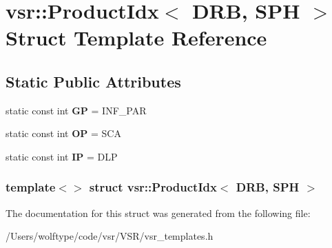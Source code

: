 \hypertarget{structvsr_1_1_product_idx_3_01_d_r_b_00_01_s_p_h_01_4}{\section{vsr\-:\-:Product\-Idx$<$ D\-R\-B, S\-P\-H $>$ Struct Template Reference}
\label{structvsr_1_1_product_idx_3_01_d_r_b_00_01_s_p_h_01_4}
}
\subsection*{Static Public Attributes}
\begin{DoxyCompactItemize}
\item 
\hypertarget{structvsr_1_1_product_idx_3_01_d_r_b_00_01_s_p_h_01_4_a41644a48ad4ee1b5ca718ecca1236690}{static const int {\bfseries G\-P} = I\-N\-F\-\_\-\-P\-A\-R}\label{structvsr_1_1_product_idx_3_01_d_r_b_00_01_s_p_h_01_4_a41644a48ad4ee1b5ca718ecca1236690}

\item 
\hypertarget{structvsr_1_1_product_idx_3_01_d_r_b_00_01_s_p_h_01_4_af702aeadbdce15f7fdeeaac12762a60e}{static const int {\bfseries O\-P} = S\-C\-A}\label{structvsr_1_1_product_idx_3_01_d_r_b_00_01_s_p_h_01_4_af702aeadbdce15f7fdeeaac12762a60e}

\item 
\hypertarget{structvsr_1_1_product_idx_3_01_d_r_b_00_01_s_p_h_01_4_a85cb03f0dd896f82f7a6ae0d572cedef}{static const int {\bfseries I\-P} = D\-L\-P}\label{structvsr_1_1_product_idx_3_01_d_r_b_00_01_s_p_h_01_4_a85cb03f0dd896f82f7a6ae0d572cedef}

\end{DoxyCompactItemize}
\subsubsection*{template$<$$>$ struct vsr\-::\-Product\-Idx$<$ D\-R\-B, S\-P\-H $>$}



The documentation for this struct was generated from the following file\-:\begin{DoxyCompactItemize}
\item 
/\-Users/wolftype/code/vsr/\-V\-S\-R/vsr\-\_\-templates.\-h\end{DoxyCompactItemize}
